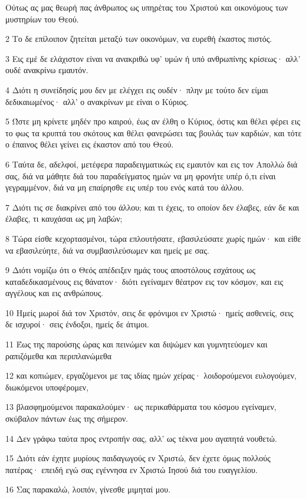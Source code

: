 \par Ούτως ας μας θεωρή πας άνθρωπος ως υπηρέτας του Χριστού και οικονόμους των μυστηρίων του Θεού.
\par 2 Το δε επίλοιπον ζητείται μεταξύ των οικονόμων, να ευρεθή έκαστος πιστός.
\par 3 Εις εμέ δε ελάχιστον είναι να ανακριθώ υφ' υμών ή υπό ανθρωπίνης κρίσεως· αλλ' ουδέ ανακρίνω εμαυτόν.
\par 4 Διότι η συνείδησίς μου δεν με ελέγχει εις ουδέν· πλην με τούτο δεν είμαι δεδικαιωμένος· αλλ' ο ανακρίνων με είναι ο Κύριος.
\par 5 Ώστε μη κρίνετε μηδέν προ καιρού, έως αν έλθη ο Κύριος, όστις και θέλει φέρει εις το φως τα κρυπτά του σκότους και θέλει φανερώσει τας βουλάς των καρδιών, και τότε ο έπαινος θέλει γείνει εις έκαστον από του Θεού.
\par 6 Ταύτα δε, αδελφοί, μετέφερα παραδειγματικώς εις εμαυτόν και εις τον Απολλώ διά σας, διά να μάθητε διά του παραδείγματος ημών να μη φρονήτε υπέρ ό,τι είναι γεγραμμένον, διά να μη επαίρησθε εις υπέρ του ενός κατά του άλλου.
\par 7 Διότι τις σε διακρίνει από του άλλου; και τι έχεις, το οποίον δεν έλαβες, εάν δε και έλαβες, τι καυχάσαι ως μη λαβών;
\par 8 Τώρα είσθε κεχορτασμένοι, τώρα επλουτήσατε, εβασιλεύσατε χωρίς ημών· και είθε να εβασιλεύητε, διά να συμβασιλεύσωμεν και ημείς με σας.
\par 9 Διότι νομίζω ότι ο Θεός απέδειξεν ημάς τους αποστόλους εσχάτους ως καταδεδικασμένους εις θάνατον· διότι εγείναμεν θέατρον εις τον κόσμον, και εις αγγέλους και εις ανθρώπους.
\par 10 Ημείς μωροί διά τον Χριστόν, σεις δε φρόνιμοι εν Χριστώ· ημείς ασθενείς, σεις δε ισχυροί· σεις ένδοξοι, ημείς δε άτιμοι.
\par 11 Έως της παρούσης ώρας και πεινώμεν και διψώμεν και γυμνητεύομεν και ραπιζόμεθα και περιπλανώμεθα
\par 12 και κοπιώμεν, εργαζόμενοι με τας ιδίας ημών χείρας· λοιδορούμενοι ευλογούμεν, διωκόμενοι υποφέρομεν,
\par 13 βλασφημούμενοι παρακαλούμεν· ως περικαθάρματα του κόσμου εγείναμεν, σκύβαλον πάντων έως της σήμερον.
\par 14 Δεν γράφω ταύτα προς εντροπήν σας, αλλ' ως τέκνα μου αγαπητά νουθετώ.
\par 15 Διότι εάν έχητε μυρίους παιδαγωγούς εν Χριστώ, δεν έχετε όμως πολλούς πατέρας· επειδή εγώ σας εγέννησα εν Χριστώ Ιησού διά του ευαγγελίου.
\par 16 Σας παρακαλώ, λοιπόν, γίνεσθε μιμηταί μου.
